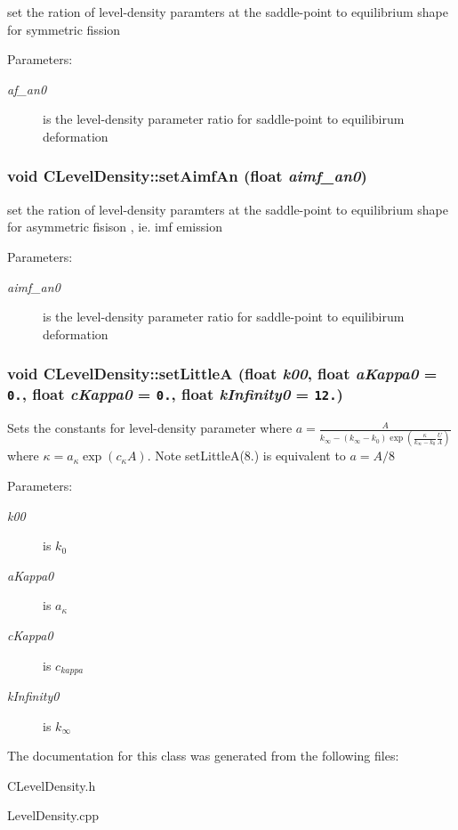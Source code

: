 set the ration of level-density paramters at the saddle-point to equilibrium shape for symmetric fission \begin{Desc}
\item[Parameters:]
\begin{description}
\item[{\em af\_\-an0}]is the level-density parameter ratio for saddle-point to equilibirum deformation \end{description}
\end{Desc}
\subsubsection{\setlength{\rightskip}{0pt plus 5cm}void CLevel\-Density::set\-Aimf\-An (float {\em aimf\_\-an0})\hspace{0.3cm}{\tt  [static]}}\label{classCLevelDensity_038598d13bb39c8a2cec9c54549284e8}


set the ration of level-density paramters at the saddle-point to equilibrium shape for asymmetric fisison , ie. imf emission \begin{Desc}
\item[Parameters:]
\begin{description}
\item[{\em aimf\_\-an0}]is the level-density parameter ratio for saddle-point to equilibirum deformation \end{description}
\end{Desc}
\subsubsection{\setlength{\rightskip}{0pt plus 5cm}void CLevel\-Density::set\-Little\-A (float {\em k00}, float {\em a\-Kappa0} = {\tt 0.}, float {\em c\-Kappa0} = {\tt 0.}, float {\em k\-Infinity0} = {\tt 12.})\hspace{0.3cm}{\tt  [static]}}\label{classCLevelDensity_f92ce917d4fc2c1c57bed9cf904c1da4}


Sets the constants for level-density parameter where $a=\frac{A}{k_{\infty} - \left(k_{\infty} -k_{0} \right) \exp\left( \frac{\kappa}{k_{\infty}-k_{0}}\frac{U}{A}\right)}$ where $ \kappa = a_{\kappa} \exp\left(c_{\kappa} A\right) $. Note set\-Little\-A(8.) is equivalent to $a=A/8$ \begin{Desc}
\item[Parameters:]
\begin{description}
\item[{\em k00}]is $k_{0}$ \item[{\em a\-Kappa0}]is $a_{\kappa}$ \item[{\em c\-Kappa0}]is $c_{kappa}$ \item[{\em k\-Infinity0}]is $k_{\infty}$ \end{description}
\end{Desc}


The documentation for this class was generated from the following files:\begin{CompactItemize}
\item 
CLevel\-Density.h\item 
Level\-Density.cpp\end{CompactItemize}
